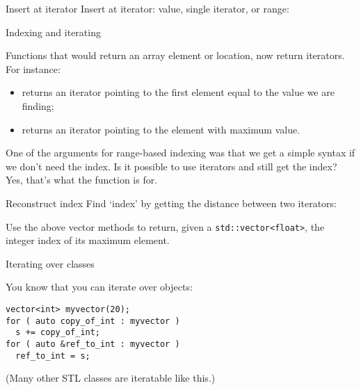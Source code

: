 \begin{block}{Insert at iterator}
  \label{sl:iter-insert}
  Insert at iterator: value, single iterator, or range:
\end{block}

 {Indexing and iterating}

Functions that would return an array element or location,
now return iterators. For instance:
\begin{itemize}
\item {} returns an iterator pointing to the first element
  equal to the value we are finding;
\item {} returns an iterator pointing to the
  element with maximum value.
\end{itemize}

One of the arguments for range-based indexing was
that we get a simple syntax if we don't need the index.
Is it possible to use iterators and still get the index?
Yes, that's what the function  is for.

\begin{block}{Reconstruct index}
  \label{sl:iterator-distance}
  Find `index' by getting the distance between
  two iterators:
\end{block}


\begin{exercise}
  Use the above vector methods to return,
  given a \lstinline+std::vector<float>+,
  the integer index of its maximum element.
\end{exercise}

 {Iterating over classes}
\label{sec:range-iter}

You know that you can iterate over  objects:
\begin{lstlisting}
vector<int> myvector(20);
for ( auto copy_of_int : myvector )
  s += copy_of_int;
for ( auto &ref_to_int : myvector )
  ref_to_int = s;
\end{lstlisting}
(Many other \ac{STL} classes are iteratable like this.)

